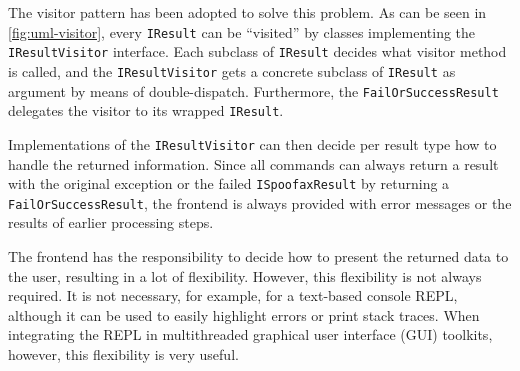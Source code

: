 The visitor pattern has been adopted to solve this problem. As can be seen in
\cref{fig:uml-visitor}, every \texttt{IResult} can be ``visited'' by classes
implementing the \texttt{IResultVisitor} interface. Each subclass of
\texttt{IResult} decides what visitor method is called, and the
\texttt{IResultVisitor} gets a concrete subclass of \texttt{IResult} as argument
by means of double-dispatch. Furthermore, the \texttt{FailOrSuccessResult}
delegates the visitor to its wrapped \texttt{IResult}.

Implementations of the \texttt{IResultVisitor} can then decide per result type
how to handle the returned information. Since all commands can always return a
result with the original exception or the failed \texttt{ISpoofaxResult} by
returning a \texttt{FailOrSuccessResult}, the frontend is always provided with
error messages or the results of earlier processing steps.

The frontend has the responsibility to decide how to present the returned data
to the user, resulting in a lot of flexibility. However, this flexibility is not
always required. It is not necessary, for example, for a text-based console
REPL, although it can be used to easily highlight errors or print stack
traces. When integrating the REPL in multithreaded graphical user interface
(GUI) toolkits, however, this flexibility is very useful.

